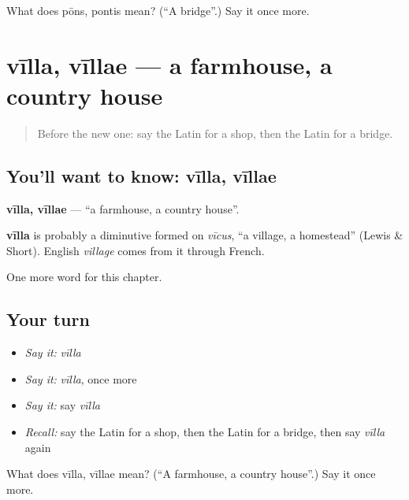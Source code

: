 \begin{tcolorbox}[breakable,colback=teal!4,colframe=teal!35!black,title={Before you move on}]
What does pōns, pontis mean? (\textquotedblleft{}A bridge\textquotedblright{}.) Say it once more.
\end{tcolorbox}
\section[vīlla, vīllae]{vīlla, vīllae — a farmhouse, a country house}

\label{lesson:LA-C108-villa}



\begin{quote}
Before the new one: say the Latin for a shop, then the Latin for a bridge.
\end{quote}

\subsection*{You'll want to know: vīlla, vīllae}
\textbf{vīlla, vīllae} — \textquotedblleft{}a farmhouse, a country house\textquotedblright{}.

\begin{cousinweb}
\textbf{vīlla} is probably a diminutive formed on \emph{vīcus}, \textquotedblleft{}a village, a homestead\textquotedblright{} (Lewis \& Short). English \emph{village} comes from it through French.
\end{cousinweb}

\begin{grammarlens}[title={What you've built}]
One more word for this chapter.
\end{grammarlens}

\subsection*{Your turn}
\begin{itemize}
\raggedright
  \item \emph{Say it:} \emph{vīlla}
  \item \emph{Say it:} \emph{vīlla}, once more
  \item \emph{Say it:} say \emph{vīlla}
  \item \emph{Recall:} say the Latin for a shop, then the Latin for a bridge, then say \emph{vīlla} again
\end{itemize}

\begin{tcolorbox}[breakable,colback=teal!4,colframe=teal!35!black,title={Before you move on}]
What does vīlla, vīllae mean? (\textquotedblleft{}A farmhouse, a country house\textquotedblright{}.) Say it once more.
\end{tcolorbox}
